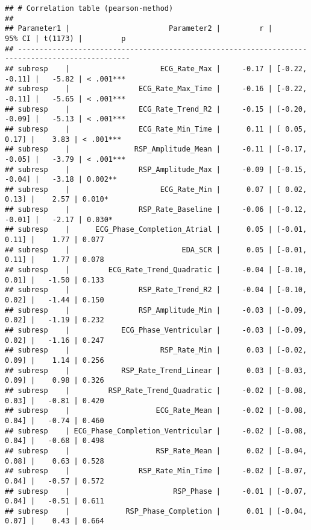 \documentclass[
]{article}
\begin{document}
\begin{verbatim}
## # Correlation table (pearson-method)
## 
## Parameter1 |                       Parameter2 |         r |         95% CI | t(1173) |         p
## ------------------------------------------------------------------------------------------------
## subresp    |                     ECG_Rate_Max |     -0.17 | [-0.22, -0.11] |   -5.82 | < .001***
## subresp    |                ECG_Rate_Max_Time |     -0.16 | [-0.22, -0.11] |   -5.65 | < .001***
## subresp    |                ECG_Rate_Trend_R2 |     -0.15 | [-0.20, -0.09] |   -5.13 | < .001***
## subresp    |                ECG_Rate_Min_Time |      0.11 | [ 0.05,  0.17] |    3.83 | < .001***
## subresp    |               RSP_Amplitude_Mean |     -0.11 | [-0.17, -0.05] |   -3.79 | < .001***
## subresp    |                RSP_Amplitude_Max |     -0.09 | [-0.15, -0.04] |   -3.18 | 0.002**  
## subresp    |                     ECG_Rate_Min |      0.07 | [ 0.02,  0.13] |    2.57 | 0.010*   
## subresp    |                RSP_Rate_Baseline |     -0.06 | [-0.12, -0.01] |   -2.17 | 0.030*   
## subresp    |      ECG_Phase_Completion_Atrial |      0.05 | [-0.01,  0.11] |    1.77 | 0.077    
## subresp    |                          EDA_SCR |      0.05 | [-0.01,  0.11] |    1.77 | 0.078    
## subresp    |         ECG_Rate_Trend_Quadratic |     -0.04 | [-0.10,  0.01] |   -1.50 | 0.133    
## subresp    |                RSP_Rate_Trend_R2 |     -0.04 | [-0.10,  0.02] |   -1.44 | 0.150    
## subresp    |                RSP_Amplitude_Min |     -0.03 | [-0.09,  0.02] |   -1.19 | 0.232    
## subresp    |            ECG_Phase_Ventricular |     -0.03 | [-0.09,  0.02] |   -1.16 | 0.247    
## subresp    |                     RSP_Rate_Min |      0.03 | [-0.02,  0.09] |    1.14 | 0.256    
## subresp    |            RSP_Rate_Trend_Linear |      0.03 | [-0.03,  0.09] |    0.98 | 0.326    
## subresp    |         RSP_Rate_Trend_Quadratic |     -0.02 | [-0.08,  0.03] |   -0.81 | 0.420    
## subresp    |                    ECG_Rate_Mean |     -0.02 | [-0.08,  0.04] |   -0.74 | 0.460    
## subresp    | ECG_Phase_Completion_Ventricular |     -0.02 | [-0.08,  0.04] |   -0.68 | 0.498    
## subresp    |                    RSP_Rate_Mean |      0.02 | [-0.04,  0.08] |    0.63 | 0.528    
## subresp    |                RSP_Rate_Min_Time |     -0.02 | [-0.07,  0.04] |   -0.57 | 0.572    
## subresp    |                        RSP_Phase |     -0.01 | [-0.07,  0.04] |   -0.51 | 0.611    
## subresp    |             RSP_Phase_Completion |      0.01 | [-0.04,  0.07] |    0.43 | 0.664    

\end{verbatim}
\end{document}
